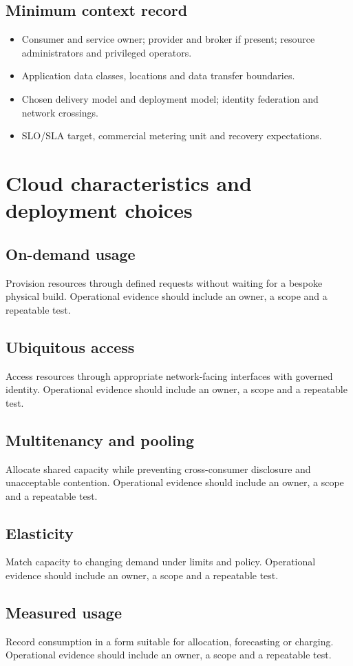 \documentclass[10pt,letterpaper]{article}
\begin{document}
\subsection{Minimum context record}
\begin{itemize}
\item Consumer and service owner; provider and broker if present; resource administrators and privileged operators.
\item Application data classes, locations and data transfer boundaries.
\item Chosen delivery model and deployment model; identity federation and network crossings.
\item SLO/SLA target, commercial metering unit and recovery expectations.
\end{itemize}
\section{Cloud characteristics and deployment choices}
\subsection{On-demand usage}
Provision resources through defined requests without waiting for a bespoke physical build. Operational evidence should include an owner, a scope and a repeatable test.
\subsection{Ubiquitous access}
Access resources through appropriate network-facing interfaces with governed identity. Operational evidence should include an owner, a scope and a repeatable test.
\subsection{Multitenancy and pooling}
Allocate shared capacity while preventing cross-consumer disclosure and unacceptable contention. Operational evidence should include an owner, a scope and a repeatable test.
\subsection{Elasticity}
Match capacity to changing demand under limits and policy. Operational evidence should include an owner, a scope and a repeatable test.
\subsection{Measured usage}
Record consumption in a form suitable for allocation, forecasting or charging. Operational evidence should include an owner, a scope and a repeatable test.
\end{document}
